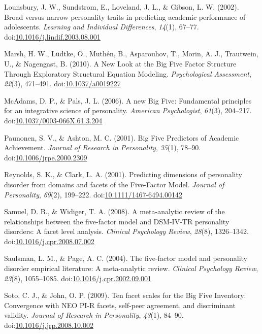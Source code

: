 \documentclass[floatsintext,man]{apa6}
\theoremstyle{definition}
\theoremstyle{definition}
\theoremstyle{definition}
\theoremstyle{remark}
\begin{document}
\leavevmode\hypertarget{ref-Lounsbury2002}{}%
Lounsbury, J. W., Sundstrom, E., Loveland, J. L., \& Gibson, L. W.
(2002). Broad versus narrow personality traits in predicting academic
performance of adolescents. \emph{Learning and Individual Differences},
\emph{14}(1), 67--77.
doi:\href{https://doi.org/10.1016/j.lindif.2003.08.001}{10.1016/j.lindif.2003.08.001}

\leavevmode\hypertarget{ref-Marsh2010}{}%
Marsh, H. W., Lüdtke, O., Muthén, B., Asparouhov, T., Morin, A. J.,
Trautwein, U., \& Nagengast, B. (2010). A New Look at the Big Five
Factor Structure Through Exploratory Structural Equation Modeling.
\emph{Psychological Assessment}, \emph{22}(3), 471--491.
doi:\href{https://doi.org/10.1037/a0019227}{10.1037/a0019227}

\leavevmode\hypertarget{ref-McAdams2006a}{}%
McAdams, D. P., \& Pals, J. L. (2006). A new Big Five: Fundamental
principles for an integrative science of personality. \emph{American
Psychologist}, \emph{61}(3), 204--217.
doi:\href{https://doi.org/10.1037/0003-066X.61.3.204}{10.1037/0003-066X.61.3.204}

\leavevmode\hypertarget{ref-Paunonen2001}{}%
Paunonen, S. V., \& Ashton, M. C. (2001). Big Five Predictors of
Academic Achievement. \emph{Journal of Research in Personality},
\emph{35}(1), 78--90.
doi:\href{https://doi.org/10.1006/jrpe.2000.2309}{10.1006/jrpe.2000.2309}

\leavevmode\hypertarget{ref-ClarkReynolds2001}{}%
Reynolds, S. K., \& Clark, L. A. (2001). Predicting dimensions of
personality disorder from domains and facets of the Five-Factor Model.
\emph{Journal of Personality}, \emph{69}(2), 199--222.
doi:\href{https://doi.org/10.1111/1467-6494.00142}{10.1111/1467-6494.00142}

\leavevmode\hypertarget{ref-SamuelWidiger2008}{}%
Samuel, D. B., \& Widiger, T. A. (2008). A meta-analytic review of the
relationships between the five-factor model and DSM-IV-TR personality
disorders: A facet level analysis. \emph{Clinical Psychology Review},
\emph{28}(8), 1326--1342.
doi:\href{https://doi.org/10.1016/j.cpr.2008.07.002}{10.1016/j.cpr.2008.07.002}

\leavevmode\hypertarget{ref-SaulsmanPage2004}{}%
Saulsman, L. M., \& Page, A. C. (2004). The five-factor model and
personality disorder empirical literature: A meta-analytic review.
\emph{Clinical Psychology Review}, \emph{23}(8), 1055--1085.
doi:\href{https://doi.org/10.1016/j.cpr.2002.09.001}{10.1016/j.cpr.2002.09.001}

\leavevmode\hypertarget{ref-SotoJohn2009}{}%
Soto, C. J., \& John, O. P. (2009). Ten facet scales for the Big Five
Inventory: Convergence with NEO PI-R facets, self-peer agreement, and
discriminant validity. \emph{Journal of Research in Personality},
\emph{43}(1), 84--90.
doi:\href{https://doi.org/10.1016/j.jrp.2008.10.002}{10.1016/j.jrp.2008.10.002}
\end{document}
